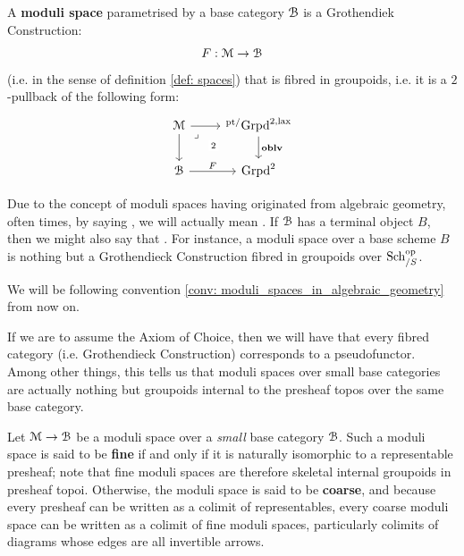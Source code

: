             \begin{definition} \label{def: moduli_space}
                A \textbf{moduli space} parametrised by a base category $\mathcal{B}$ is a Grothendiek Construction:
                    $$F: \mathcal{M} \to \mathcal{B}$$
                (i.e.  in the sense of definition \ref{def: spaces}) that is fibred in groupoids, i.e. it is a $2$-pullback of the following form:
                    $$
                        \begin{tikzcd}
                        	{\calM} & {{}^{\pt/}\Grpd^{2, \lax}} \\
                        	\calB & {\Grpd^2}
                        	\arrow[from=1-1, to=2-1]
                        	\arrow["F", from=2-1, to=2-2]
                        	\arrow["\oblv", from=1-2, to=2-2]
                        	\arrow[from=1-1, to=1-2]
                        	\arrow["2"{description}, "\lrcorner"{anchor=center, pos=0.125}, draw=none, from=1-1, to=2-2]
                        \end{tikzcd}
                    $$
            \end{definition}
            \begin{convention} \label{conv: moduli_spaces_in_algebraic_geometry}
                Due to the concept of moduli spaces having originated from algebraic geometry, often times, by saying , we will actually mean . If $\mathcal{B}$ has a terminal object $B$, then we might also say that . For instance, a moduli space over a base scheme $B$ is nothing but a Grothendieck Construction fibred in groupoids over $\mathrm{Sch}_{/S}^{\mathrm{op}}$.
            \end{convention}
            We will be following convention \ref{conv: moduli_spaces_in_algebraic_geometry} from now on.
            \begin{remark} \label{remark: moduli_spaces_over_small_categories}
                If we are to assume the Axiom of Choice, then we will have that every fibred category (i.e. Grothendieck Construction) corresponds to a pseudofunctor. Among other things, this tells us that moduli spaces over small base categories are actually nothing but groupoids internal to the presheaf topos over the same base category. 
            \end{remark}
            \begin{definition} \label{def: fine_and_coarse_moduli_spaces}
                Let $\mathcal{M} \to \mathcal{B}$ be a moduli space over a \textit{small} base category $\mathcal{B}$. Such a moduli space is said to be \textbf{fine} if and only if it is naturally isomorphic to a representable presheaf; note that fine moduli spaces are therefore skeletal internal groupoids in presheaf topoi. Otherwise, the moduli space is said to be \textbf{coarse}, and because every presheaf can be written as a colimit of representables, every coarse moduli space can be written as a colimit of fine moduli spaces, particularly colimits of diagrams whose edges are all invertible arrows.
            \end{definition} 

